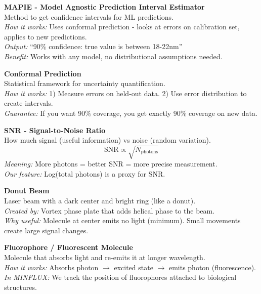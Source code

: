 \documentclass[a4paper,10pt]{article}
\begin{document}
\begin{mdframed}[style=glossar]
\textbf{MAPIE - Model Agnostic Prediction Interval Estimator}\\[3pt]
Method to get confidence intervals for ML predictions.\\
\textit{How it works:} Uses conformal prediction - looks at errors on calibration set, applies to new predictions.\\
\textit{Output:} ``90\% confidence: true value is between 18-22nm''\\
\textit{Benefit:} Works with any model, no distributional assumptions needed.
\end{mdframed}

\begin{mdframed}[style=glossar]
\textbf{Conformal Prediction}\\[3pt]
Statistical framework for uncertainty quantification.\\
\textit{How it works:} 1) Measure errors on held-out data. 2) Use error distribution to create intervals.\\
\textit{Guarantee:} If you want 90\% coverage, you get exactly 90\% coverage on new data.
\end{mdframed}

\begin{mdframed}[style=glossar]
\textbf{SNR - Signal-to-Noise Ratio}\\[3pt]
How much signal (useful information) vs noise (random variation).\\
$$\text{SNR} \propto \sqrt{N_{\text{photons}}}$$
\textit{Meaning:} More photons = better SNR = more precise measurement.\\
\textit{Our feature:} Log(total photons) is a proxy for SNR.
\end{mdframed}

\begin{mdframed}[style=glossar]
\textbf{Donut Beam}\\[3pt]
Laser beam with a dark center and bright ring (like a donut).\\
\textit{Created by:} Vortex phase plate that adds helical phase to the beam.\\
\textit{Why useful:} Molecule at center emits no light (minimum). Small movements create large signal changes.
\end{mdframed}

\begin{mdframed}[style=glossar]
\textbf{Fluorophore / Fluorescent Molecule}\\[3pt]
Molecule that absorbs light and re-emits it at longer wavelength.\\
\textit{How it works:} Absorbs photon $\rightarrow$ excited state $\rightarrow$ emits photon (fluorescence).\\
\textit{In MINFLUX:} We track the position of fluorophores attached to biological structures.
\end{mdframed}
\end{document}
